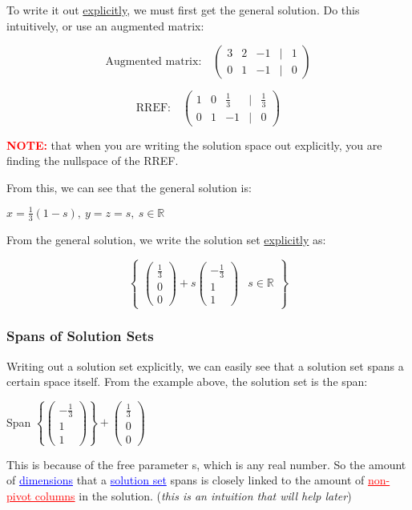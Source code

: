 \documentclass{article}
\newcommand{\bul}[1]{\textcolor{blue}{\underline{#1}}}
\newcommand{\rul}[1]{\textcolor{red}{\underline{#1}}}
\newcommand{\sbreak}{\vspace{10pt}}
\begin{document}
\sbreak

To write it out \underline{explicitly}, we must first get the general solution. Do this intuitively, or use an augmented matrix:

\[
\text{Augmented matrix:} \quad 
\begin{pmatrix}
3 & 2 & -1 & | & 1 \\
0 & 1 & -1 & | & 0
\end{pmatrix}
\]

\[
\text{RREF:} \quad 
\begin{pmatrix}
1 & 0 & \frac{1}{3} & | & \frac{1}{3} \\
0 & 1 & -1 & | & 0
\end{pmatrix}
\]

\textbf{\textcolor{red}{NOTE:}} that when you are writing the solution space out explicitly, you are finding the nullspace of the RREF.


From this, we can see that the general solution is:

$x = \frac{1}{3}(1-s),\ y=z=s,\ s\in\mathbb{R}$

From the general solution, we write the solution set \underline{explicitly} as:

\[
\left\{
\begin{array}{c|c}
    \begin{pmatrix}
        \frac{1}{3} \\ 0 \\ 0
    \end{pmatrix} + s 
    \begin{pmatrix}
        -\frac{1}{3} \\ 1 \\ 1
    \end{pmatrix}
    &
    s \in \mathbb{R}
\end{array}
\right\}
\]

\subsubsection{Spans of Solution Sets}
Writing out a solution set explicitly, we can easily see that a solution set spans a certain space itself. From the example above, the solution set is the span:
\begin{center}
    Span $\left\{\left(\begin{array}{c}
        -\frac{1}{3} \\ 1 \\ 1
    \end{array}\right)\right\} + \begin{pmatrix}
        \frac{1}{3} \\ 0 \\ 0
    \end{pmatrix}$
\end{center}
This is because of the free parameter s, which is any real number. So the amount of \bul{dimensions} that a \bul{solution set} spans is closely linked to the amount of \rul{non-pivot columns} in the solution. (\textit{this is an intuition that will help later})
\end{document}
